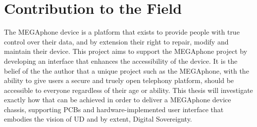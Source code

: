 \section{Contribution to the Field}
The MEGAphone device is a platform that exists to provide people with true control over their data, and by extension their right to repair, modify and maintain their device.
This project aims to support the MEGAphone project by developing an interface that enhances the accessibility of the device.
It is the belief of the the author that a unique project such as the MEGAphone, with the ability to give users a secure and truely open telephony platform, should be accessible to everyone regardless of their age or ability.
This thesis will investigate exactly how that can be achieved in order to deliver a MEGAphone device chassis, supporting PCBs and hardware-implemented user interface that embodies the vision of UD and by extent, Digital Sovereignty. %